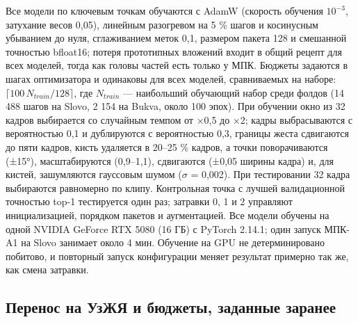 Все модели по ключевым точкам обучаются с AdamW (скорость обучения \(10^{-3}\), затухание весов 0,05), линейным разогревом на 5 \% шагов и косинусным убыванием до нуля, сглаживанием меток 0,1, размером пакета 128 и смешанной точностью bfloat16; потеря прототипных вложений входит в общий рецепт для всех моделей, тогда как головы частей есть только у МПК. Бюджеты задаются в шагах оптимизатора и одинаковы для всех моделей, сравниваемых на наборе: \(\lceil 100\,N_{train}/128 \rceil\), где \(N_{train}\) --- наибольший обучающий набор среди фолдов (14 488 шагов на Slovo, 2 154 на Bukva, около 100 эпох). При обучении окно из 32 кадров выбирается со случайным темпом от ×0,5 до ×2; кадры выбрасываются с вероятностью 0,1 и дублируются с вероятностью 0,3, границы жеста сдвигаются до пяти кадров, кисть удаляется в 20--25 \% кадров, а точки поворачиваются (±15°), масштабируются (0,9--1,1), сдвигаются (±0,05 ширины кадра) и, для кистей, зашумляются гауссовым шумом (\(\sigma\) = 0,002). При тестировании 32 кадра выбираются равномерно по клипу. Контрольная точка с лучшей валидационной точностью top-1 тестируется один раз; затравки 0, 1 и 2 управляют инициализацией, порядком пакетов и аугментацией. Все модели обучены на одной NVIDIA GeForce RTX 5080 (16 ГБ) с PyTorch 2.14.1; один запуск МПК-A1 на Slovo занимает около 4 мин. Обучение на GPU не детерминировано побитово, и повторный запуск конфигурации меняет результат примерно так же, как смена затравки.

\hypertarget{ux43fux435ux440ux435ux43dux43eux441-ux43dux430-ux443ux437ux436ux44f-ux438-ux431ux44eux434ux436ux435ux442ux44b-ux437ux430ux434ux430ux43dux43dux44bux435-ux437ux430ux440ux430ux43dux435ux435}{%
\subsection{Перенос на УзЖЯ и бюджеты, заданные заранее}\label{ux43fux435ux440ux435ux43dux43eux441-ux43dux430-ux443ux437ux436ux44f-ux438-ux431ux44eux434ux436ux435ux442ux44b-ux437ux430ux434ux430ux43dux43dux44bux435-ux437ux430ux440ux430ux43dux435ux435}}


